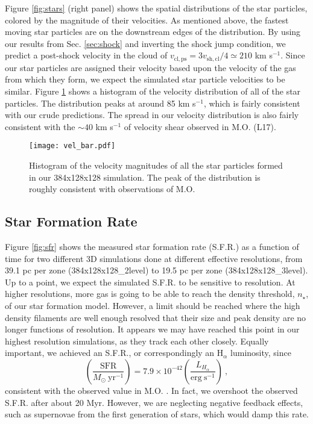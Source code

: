 \documentclass{aastex6}
\begin{document}
Figure \ref{fig:stars} (right panel) shows the spatial distributions of the star particles, colored by the magnitude of their velocities.  As mentioned above, the fastest moving star particles are on the downstream edges of the distribution. By using our results from Sec. \ref{sec:shock} and inverting the shock jump condition, we predict a post-shock velocity in the cloud of $v_\mathrm{cl,ps} = 3 v_\mathrm{sh,cl}/4 \simeq 210$ km s$^{-1}$. Since our star particles are assigned their velocity based upon the velocity of the gas from which they form, we expect the simulated star particle velocities to be similar.  Figure \ref{fig:histogram} shows a histogram of the velocity distribution of all of the star particles. The distribution peaks at around 85 km s$^{-1}$, which is fairly consistent with our crude predictions. The spread in our velocity distribution is also fairly consistent with the $\sim 40$ km s$^{-1}$ of velocity shear observed in M.O. (L17).

\begin{figure}
\texttt{[image: vel\_bar.pdf]} 
\caption{Histogram of the velocity magnitudes of all the star particles formed in our 384x128x128 simulation. The peak of the distribution is roughly consistent with observations of M.O.
\label{fig:histogram}}
\end{figure}



\subsection{Star Formation Rate}
\label{sec:sfr}

Figure \ref{fig:sfr} shows the measured star formation rate (S.F.R.) as a function of time for two different 3D simulations done at different effective resolutions, from 39.1 pc per zone (384x128x128\_2level) to 19.5 pc per zone (384x128x128\_3level). Up to a point, we expect the simulated S.F.R. to be sensitive to resolution. At higher resolutions, more gas is going to be able to reach the density threshold, $n_\star$, of our star formation model. However, a limit should be reached where the high density filaments are well enough resolved that their size and peak density are no longer functions of resolution. It appears we may have reached this point in our highest resolution simulations, as they track each other closely. Equally important, we achieved an S.F.R., or correspondingly an H$_\alpha$ luminosity, since \citep{Kennicutt98}
\begin{equation}
\left(\frac{\mathrm{SFR}}{M_\odot~\mathrm{yr}^{-1}} \right) = 7.9 \times 10^{-42} \left(\frac{L_{H_\alpha}}{\mathrm{erg~s}^{-1}}\right) ~,
\end{equation}
consistent with the observed value in M.O. \citep[$\mathrm{S.F.R.} = 0.47 M_\odot$ yr$^{-1}$ or $L_{H_\alpha} = 5.9 \times 10^{40}$ erg s$^{-1}$;][]{Salome15}.  In fact, we overshoot the observed S.F.R. after about 20 Myr. However, we are neglecting negative feedback effects, such as supernovae from the first generation of stars, which would damp this rate.
\end{document}
